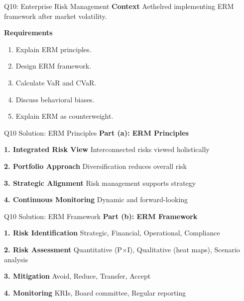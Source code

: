 \documentclass[aspectratio=169,10pt]{beamer}
\renewcommand{\small}{\fontsize{6pt}{7.5pt}\selectfont}
\renewcommand{\large}{\fontsize{8pt}{10pt}\selectfont}
\newcommand{\question}[1]{{\large\bfseries\color{crimson}#1}}
\begin{document}
	\begin{frame}{Q10: Enterprise Risk Management}
		\question{Context}
		\small
		Aethelred implementing ERM framework after market volatility.
		
		\vspace{0.1cm}
		\question{Requirements}
		\begin{enumerate}
			\item Explain ERM principles.
			\item Design ERM framework.
			\item Calculate VaR and CVaR.
			\item Discuss behavioral biases.
			\item Explain ERM as counterweight.
		\end{enumerate}
	\end{frame}
	
	\begin{frame}{Q10 Solution: ERM Principles}
		\question{Part (a): ERM Principles}
		\small
		
		\textbf{1. Integrated Risk View}
		Interconnected risks viewed holistically
		
		\vspace{0.1cm}
		\textbf{2. Portfolio Approach}
		Diversification reduces overall risk
		
		\vspace{0.1cm}
		\textbf{3. Strategic Alignment}
		Risk management supports strategy
		
		\vspace{0.1cm}
		\textbf{4. Continuous Monitoring}
		Dynamic and forward-looking
	\end{frame}
	
	\begin{frame}{Q10 Solution: ERM Framework}
		\question{Part (b): ERM Framework}
		\small
		
		\textbf{1. Risk Identification}
		Strategic, Financial, Operational, Compliance
		
		\vspace{0.1cm}
		\textbf{2. Risk Assessment}
		Quantitative (P$\times$I), Qualitative (heat maps), Scenario analysis
		
		\vspace{0.1cm}
		\textbf{3. Mitigation}
		Avoid, Reduce, Transfer, Accept
		
		\vspace{0.1cm}
		\textbf{4. Monitoring}
		KRIs, Board committee, Regular reporting
	\end{frame}
	
\end{document}
